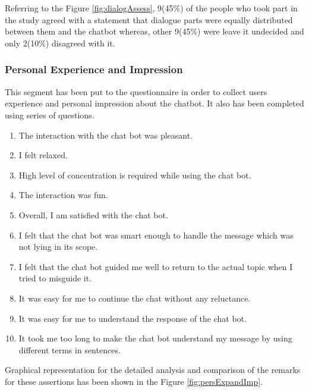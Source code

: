\\~\\
Referring to the Figure \ref{fig:dialogAssess}, 9(45\%) of the people who took part in the study agreed with a statement that dialogue parts were equally distributed between them and the chatbot whereas, other 9(45\%) were leave it undecided and only 2(10\%) disagreed with it.


\subsubsection*{Personal Experience and Impression}
This segment has been put to the questionnaire in order to collect users experience and personal impression about the chatbot. It also has been completed using series of questions. 
\begin{enumerate}
    \item The interaction with the chat bot was pleasant.
    \item I felt relaxed.
    \item High level of concentration is required while using the chat bot.
    \item The interaction was fun.
    \item Overall, I am satisfied with the chat bot.
    \item I felt that the chat bot was smart enough to handle the message which was not lying in its scope.
    \item I felt that the chat bot guided me well to return to the actual topic when I tried to misguide it.
    \item It was easy for me to continue the chat without any reluctance.
    \item It was easy for me to understand the response of the chat bot.
    \item It took me too long to make the chat bot understand my message by using different terms in sentences.
\end{enumerate}
Graphical representation for the detailed analysis and comparison of the remarks for these assertions has been shown in the Figure \ref{fig:persExpandImp}.

